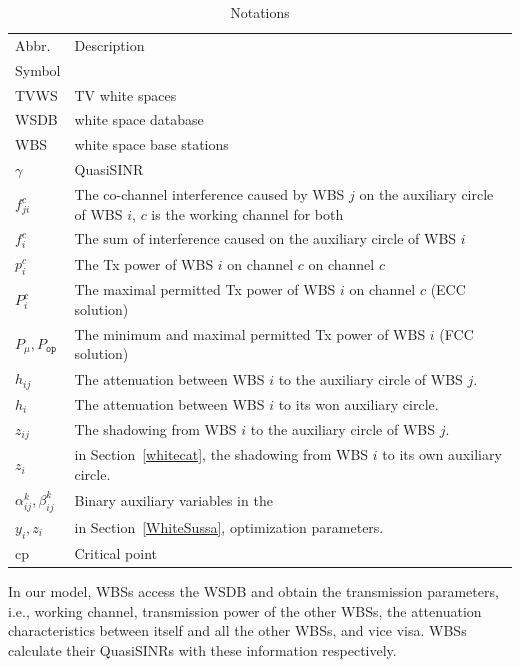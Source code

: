 \documentclass[times]{ettauth}
\newcommand{\ie}{i.e., }
\theoremstyle{mytheoremstyle}
\theoremstyle{mytheoremstyle}
\theoremstyle{mytheoremstyle}
\begin{document}
\begin{table}[h]
\caption{Notations}
\label{tab1}
\centering
\begin{tabular}{l p{5.5cm}}
\toprule
Abbr. & Description \\
Symbol & \\
\midrule
TVWS & TV white spaces\\
WSDB & white space database\\
WBS & white space base stations\\
$\gamma$ & QuasiSINR\\
$f_{ji}^c$  & The co-channel interference caused by WBS $j$ on the auxiliary circle of WBS $i$, $c$ is the working channel for both\\
$f_i^c$ & The sum of interference caused on the auxiliary circle of WBS $i$ \\
$p_i^c$		& The Tx power of WBS $i$ on channel $c$ on channel $c$\\
$P_i^c$		& The maximal permitted Tx power of WBS $i$ on channel $c$ (ECC solution)\\
$P_\mu, P_{\mathtt{op}}$		& The minimum and maximal permitted Tx power of WBS $i$ (FCC solution)\\
$h_{ij}$ & The attenuation between WBS $i$ to the auxiliary circle of WBS $j$.\\
$h_{i}$ & The attenuation between WBS $i$ to its won auxiliary circle.\\
$z_{ij}$ & The shadowing from WBS $i$ to the auxiliary circle of WBS $j$.\\
$z_{i}$ & in Section~\ref{whitecat}, the shadowing from WBS $i$ to its own auxiliary circle.\\
$\alpha_{ij}^k,\beta_{ij}^k$ & Binary auxiliary variables in the\\
$y_i, z_i$ & in Section~\ref{WhiteSussa}, optimization parameters.\\
$\text{cp}$ & Critical point\\
\bottomrule
\end{tabular}
\end{table}



In our model, WBSs access the WSDB and obtain the transmission parameters, \ie working channel, transmission power of the other WBSs, the attenuation characteristics between itself and all the other WBSs, and vice visa. 
WBSs calculate their QuasiSINRs with these information respectively.
\end{document}
